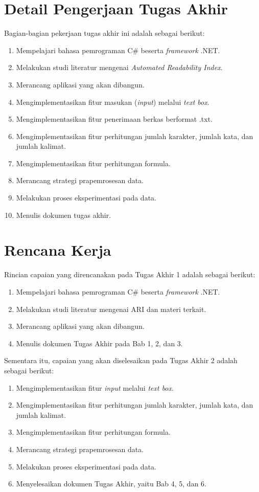 \documentclass[a4paper,twoside]{article}
\begin{document}
\section{Detail Pengerjaan Tugas Akhir}
Bagian-bagian pekerjaan tugas akhir ini adalah sebagai berikut:
\begin{enumerate}
    \item Mempelajari bahasa pemrograman C\# beserta \textit{framework} .NET.
    \item Melakukan studi literatur mengenai \textit{Automated Readability Index}.
    \item Merancang aplikasi yang akan dibangun.
    \item Mengimplementasikan fitur masukan (\textit{input}) melalui \textit{text box}.
    \item Mengimplementasikan fitur penerimaan berkas berformat .txt.
    \item Mengimplementasikan fitur perhitungan jumlah karakter, jumlah kata, dan jumlah kalimat.
    \item Mengimplementasikan fitur perhitungan formula.
    \item Merancang strategi prapemrosesan data.
    \item Melakukan proses eksperimentasi pada data.
    \item Menulis dokumen tugas akhir.
\end{enumerate}

\section{Rencana Kerja}
Rincian capaian yang direncanakan pada Tugas Akhir 1 adalah sebagai berikut:
\begin{enumerate}
    \item Mempelajari bahasa pemrograman C\# beserta \textit{framework} .NET.
    \item Melakukan studi literatur mengenai ARI dan materi terkait.
    \item Merancang aplikasi yang akan dibangun.
    \item Menulis dokumen Tugas Akhir pada Bab 1, 2, dan 3.
\end{enumerate}

Sementara itu, capaian yang akan diselesaikan pada Tugas Akhir 2 adalah sebagai berikut:
\begin{enumerate}
    \item Mengimplementasikan fitur \textit{input} melalui \textit{text box}.
    \item Mengimplementasikan fitur perhitungan jumlah karakter, jumlah kata, dan jumlah kalimat.
    \item Mengimplementasikan fitur perhitungan formula.
    \item Merancang strategi prapemrosesan data.
    \item Melakukan proses eksperimentasi pada data.
    \item Menyelesaikan dokumen Tugas Akhir, yaitu Bab 4, 5, dan 6.
\end{enumerate}
\end{document}
